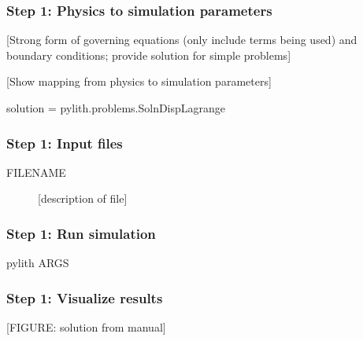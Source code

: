 \documentclass[aspectratio=169]{beamer}
\begin{document}
\begin{frame}[fragile]
  \frametitle{Step 1: Physics to simulation parameters}
  \summary{}

  [Strong form of governing equations (only include terms being used) and boundary conditions;
  provide solution for simple problems]

  \vfill
  [Show mapping from physics to simulation parameters]

\begin{cfgcode}
solution = pylith.problems.SolnDispLagrange
\end{cfgcode}
  
\end{frame}


\begin{frame}
  \frametitle{Step 1: Input files}
  \summary{}

  \begin{description}
    \item[FILENAME] [description of file]
    \end{description}
    
\end{frame}


\begin{frame}[fragile]
  \frametitle{Step 1: Run simulation}
  \summary{}

\begin{bashcode}
pylith ARGS
\end{bashcode}
  
\end{frame}


\begin{frame}
  \frametitle{Step 1: Visualize results}
  \summary{}

  [FIGURE: solution from manual]
    
\end{frame}


\end{document}
